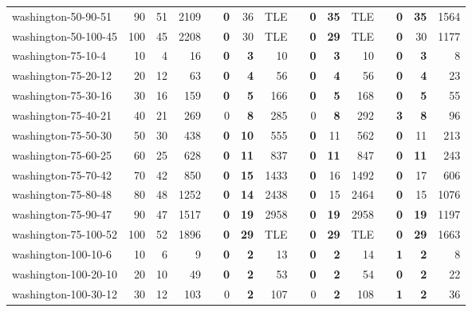 \begin{table}[!ht]
{\begin{tabular}{lrrrrrrrrrrrlrrr}
washington-50-90-51 & 90 & 51 & 2109 &  & \textbf{0} & 36 & TLE &  & \textbf{0} & \textbf{35} & TLE &  & \textbf{0} & \textbf{35} & 1564 \\
washington-50-100-45 & 100 & 45 & 2208 &  & \textbf{0} & 30 & TLE &  & \textbf{0} & \textbf{29} & TLE &  & \textbf{0} & 30 & 1177 \\ \hline
washington-75-10-4 & 10 & 4 & 16 &  & \textbf{0} & \textbf{3} & 10 &  & \textbf{0} & \textbf{3} & 10 &  & \textbf{0} & \textbf{3} & 8 \\
washington-75-20-12 & 20 & 12 & 63 &  & \textbf{0} & \textbf{4} & 56 &  & \textbf{0} & \textbf{4} & 56 &  & \textbf{0} & \textbf{4} & 23 \\
washington-75-30-16 & 30 & 16 & 159 &  & \textbf{0} & \textbf{5} & 166 &  & \textbf{0} & \textbf{5} & 168 &  & \textbf{0} & \textbf{5} & 55 \\
washington-75-40-21 & 40 & 21 & 269 &  & 0 & \textbf{8} & 285 &  & 0 & \textbf{8} & 292 &  & \textbf{3} & \textbf{8} & 96 \\
washington-75-50-30 & 50 & 30 & 438 &  & \textbf{0} & \textbf{10} & 555 &  & \textbf{0} & 11 & 562 &  & \textbf{0} & 11 & 213 \\
washington-75-60-25 & 60 & 25 & 628 &  & \textbf{0} & \textbf{11} & 837 &  & \textbf{0} & \textbf{11} & 847 &  & \textbf{0} & \textbf{11} & 243 \\
washington-75-70-42 & 70 & 42 & 850 &  & \textbf{0} & \textbf{15} & 1433 &  & \textbf{0} & 16 & 1492 &  & \textbf{0} & 17 & 606 \\
washington-75-80-48 & 80 & 48 & 1252 &  & \textbf{0} & \textbf{14} & 2438 &  & \textbf{0} & 15 & 2464 &  & \textbf{0} & 15 & 1076 \\
washington-75-90-47 & 90 & 47 & 1517 &  & \textbf{0} & \textbf{19} & 2958 &  & \textbf{0} & \textbf{19} & 2958 &  & \textbf{0} & \textbf{19} & 1197 \\
washington-75-100-52 & 100 & 52 & 1896 &  & \textbf{0} & \textbf{29} & TLE &  & \textbf{0} & \textbf{29} & TLE &  & \textbf{0} & \textbf{29} & 1663 \\ \hline
washington-100-10-6 & 10 & 6 & 9 &  & \textbf{0} & \textbf{2} & 13 &  & \textbf{0} & \textbf{2} & 14 &  & \textbf{1} & \textbf{2} & 8 \\
washington-100-20-10 & 20 & 10 & 49 &  & \textbf{0} & \textbf{2} & 53 &  & \textbf{0} & \textbf{2} & 54 &  & \textbf{0} & \textbf{2} & 22 \\
washington-100-30-12 & 30 & 12 & 103 &  & 0 & \textbf{2} & 107 &  & 0 & \textbf{2} & 108 &  & \textbf{1} & \textbf{2} & 36 \\

\end{tabular}}
\end{table}
